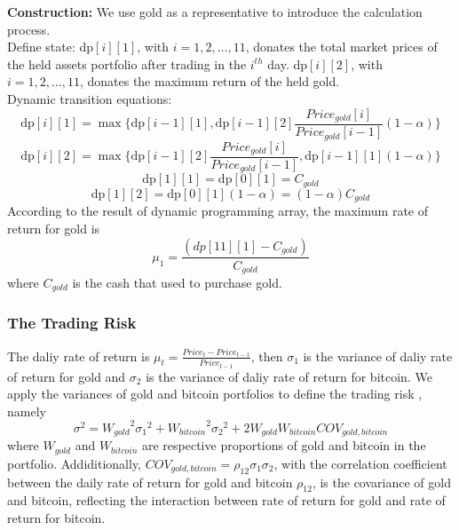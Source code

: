 \documentclass[12pt]{article}
\begin{document}
\textbf{Construction:} We use gold as a representative to introduce the calculation process.\\
Define state: dp$[i][1]$, with $i=1,2, \dots, 11$, donates the total market prices of the held assets portfolio after trading in the $i^{th}$ day. dp$[i][2]$, with $i=1,2, \dots, 11$, donates the maximum return of the held gold.\\
Dynamic transition equations: 
\begin{equation*}
\text{dp}[i][1]=\max\{\text{dp}[i-1][1], \text{dp}[i-1][2]\frac{Price_{gold}[i]}{Price_{gold}[i-1]}(1-\alpha)\}
\end{equation*}
\begin{equation*}
\text{dp}[i][2]=\max\{\text{dp}[i-1][2]\frac{Price_{gold}[i]}{Price_{gold}[i-1]}, \text{dp}[i-1][1](1-\alpha)\}
\end{equation*}
\begin{equation*}
\text{dp}[1][1]=\text{dp}[0][1]=C_{gold}
\end{equation*}
\begin{equation*}
\text{dp}[1][2]=\text{dp}[0][1](1-\alpha)=(1-\alpha)C_{gold}
\end{equation*}
According to the result of dynamic programming array, the maximum rate of return for gold is
\begin{equation*}
\mu_1=\frac{(dp[11][1]-C_{gold})}{C_{gold}}
\end{equation*}
where $C_{gold}$ is the cash that used to purchase gold.
 
\subsubsection{The Trading Risk}
The daliy rate of return is $\mu_t=\frac{Price_t-Price_{t-1}}{Price_{t-1}}$, then $\sigma_1$ is the variance of daliy rate of return for gold and $\sigma_2$ is the variance of daliy rate of return for bitcoin. We apply the variances of gold and bitcoin portfolios to define the trading risk \cite{9}, namely
\begin{equation*}
{\sigma}^2={W_{gold}}^2 {\sigma_1}^2+ {W_{bitcoin}}^2 {\sigma_2}^2+2 W_{gold} W_{bitcoin}COV_{gold, bitcoin}
\end{equation*}
where $W_{gold}$ and $W_{bitcoin}$ are respective proportions of gold and bitcoin in the portfolio. Addiditionally, $COV_{gold, bitcoin}= \rho_{12}\sigma_1\sigma_2$, with the correlation coefficient between the daily rate of return for gold and bitcoin $\rho_{12}$, is the covariance of gold and bitcoin, reflecting the interaction between rate of return for gold and rate of return for bitcoin.
\end{document}
